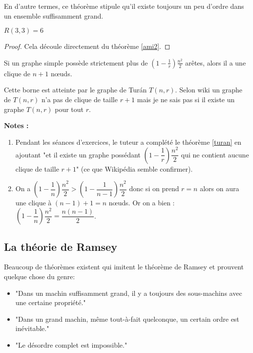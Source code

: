 \vspace{0.3cm}
En d'autre termes, ce théorème stipule qu'il existe toujours un peu d'ordre dans un ensemble suffisamment grand.

\begin{mytheo} 
  $R(3, 3) = 6$
  \begin{proof}
     Cela découle directement du théorème \ref{ami2}.
  \end{proof}
\end{mytheo}  
      

\begin{mytheo} 
 \label{turan}
Si un graphe simple possède strictement plus de $(1-\frac{1}{r})\frac{n^2}{2}$ arêtes, alors il a une clique de $n+1$ nœuds.
\end{mytheo}

Cette borne est atteinte par le graphe de Turán $T(n,r)$.  Selon wiki un graphe de $T(n,r)$ n'a pas de clique de taille $ r+1$ mais je ne sais pas si il existe un graphe $T(n,r)$ pour tout $r$.


\textbf{Notes :}
\begin{enumerate}
\item
Pendant les séances d'exercices, le tuteur a complété le théorème \ref{turan} en ajoutant "et il existe un graphe possédant $\left( 1-\dfrac{1}{r} \right) \dfrac{n^2}{2}$ qui ne contient aucune clique de taille $r+1$" (ce que Wikipédia semble confirmer).
\item
On a  $\left( 1-\dfrac{1}{n} \right) \dfrac{n^2}{2} > \left( 1-\dfrac{1}{n-1} \right) \dfrac{n^2}{2}$ donc si on prend $r=n$ alors on aura une clique à $(n-1)+1=n$ nœuds. Or on a bien : $\left( 1-\dfrac{1}{n} \right) \dfrac{n^2}{2} = \dfrac{n(n-1)}{2}$.
\end{enumerate}
   

\subsection{La théorie de Ramsey}
Beaucoup de théorèmes existent qui imitent le théorème de Ramsey et prouvent quelque chose du genre:
\begin{itemize}
\item
"Dans un machin suffisamment grand, il y a toujours des sous-machins avec une certaine propriété."
\item
"Dans un grand machin, m\^eme tout-à-fait quelconque, un certain ordre est inévitable."
\item
"Le désordre complet est impossible."
\end{itemize}
    
